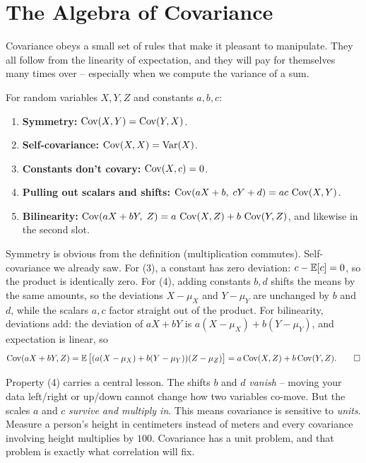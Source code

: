 \section{The Algebra of Covariance}
\label{ch14:properties}

Covariance obeys a small set of rules that make it pleasant to manipulate. They all
follow from the linearity of expectation, and they will pay for themselves many
times over -- especially when we compute the variance of a sum.

\begin{proposition}
\label{ch14:cov-props}
For random variables $X, Y, Z$ and constants $a, b, c$:
\begin{enumerate}
\item \textbf{Symmetry:} $\operatorname{Cov}(X, Y) = \operatorname{Cov}(Y, X)$.
\item \textbf{Self-covariance:} $\operatorname{Cov}(X, X) = \operatorname{Var}(X)$.
\item \textbf{Constants don't covary:} $\operatorname{Cov}(X, c) = 0$.
\item \textbf{Pulling out scalars and shifts:}
$\operatorname{Cov}(aX + b,\; cY + d) = ac\,\operatorname{Cov}(X, Y)$.
\item \textbf{Bilinearity:}
$\operatorname{Cov}(aX + bY,\; Z) = a\,\operatorname{Cov}(X, Z) + b\,\operatorname{Cov}(Y, Z)$,
and likewise in the second slot.
\end{enumerate}
\end{proposition}

\begin{whybox}
Symmetry is obvious from the definition (multiplication commutes). Self-covariance
we already saw. For (3), a constant has zero deviation: $c - \operatorname{\mathbb{E}}[c] = 0$, so the
product is identically zero. For (4), adding constants $b, d$ shifts the means by
the same amounts, so the deviations $X - \mu_X$ and $Y - \mu_Y$ are unchanged by
$b$ and $d$, while the scalars $a, c$ factor straight out of the product. For
bilinearity, deviations add: the deviation of $aX + bY$ is
$a(X-\mu_X) + b(Y-\mu_Y)$, and expectation is linear, so
\[
\operatorname{Cov}(aX+bY, Z) = \operatorname{\mathbb{E}}\big[(a(X-\mu_X)+b(Y-\mu_Y))(Z-\mu_Z)\big]
= a\operatorname{Cov}(X,Z) + b\operatorname{Cov}(Y,Z). \qedhere
\]
\end{whybox}

\begin{intuitionbox}
Property (4) carries a central lesson. The shifts $b$ and $d$ \emph{vanish} -- moving
your data left/right or up/down cannot change how two variables co-move. But the
scales $a$ and $c$ \emph{survive and multiply in}. This means covariance is
sensitive to \emph{units}. Measure a person's height in centimeters instead of
meters and every covariance involving height multiplies by $100$. Covariance has a
unit problem, and that problem is exactly what correlation will fix.
\end{intuitionbox}

